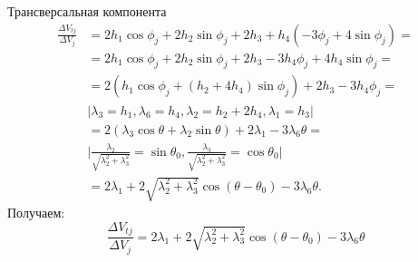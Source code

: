 \documentclass[9pt]{beamer}
\begin{document}
\begin{frame}{Трансверсальная компонента}
\begin{equation*}
    \begin{aligned}
        \frac{\Delta V_{tj}}{\Delta V_j} &= 2 h_1 \cos \phi_j + 2 h_2 \sin \phi_j + 2 h_3 + h_4 (-3 \phi_j + 4 \sin \phi_j) = \\
        &= 2 h_1 \cos \phi_j + 2 h_2 \sin \phi_j + 2 h_3 - 3 h_4 \phi_j + 4 h_4 \sin \phi_j = \\
        &= 2 \left( h_1 \cos \phi_j + (h_2 + 4 h_4) \sin \phi_j \right) + 2 h_3 - 3 h_4 \phi_j = \\
        & \vert \lambda_3 = h_1,  \lambda_6 = h_4, \lambda_2 = h_2 + 2 h_4, \lambda_1 = h_3 \vert \\
        &= 2 \left( \lambda_3 \cos \theta + \lambda_2 \sin \theta \right) + 2 \lambda_1 - 3 \lambda_6 \theta = \\
        & \vert \frac{\lambda_2}{\sqrt{\lambda_2^2 + \lambda_3^2}} = \sin \theta_0, \frac{\lambda_3}{\sqrt{\lambda_2^2 + \lambda_3^2}} = \cos \theta_0 \vert \\
        &= 2 \lambda_1 + 2 \sqrt{\lambda_2^2 + \lambda_3^2} \cos (\theta - \theta_0) - 3 \lambda_6 \theta.
    \end{aligned}
\end{equation*}
Получаем:
\begin{equation*}
    \boxed{\frac{\Delta V_{tj}}{\Delta V_j} = 2 \lambda_1 + 2 \sqrt{\lambda_2^2 + \lambda_3^2} \cos (\theta - \theta_0) - 3 \lambda_6 \theta} 
\end{equation*}
\end{frame}
\end{document}
